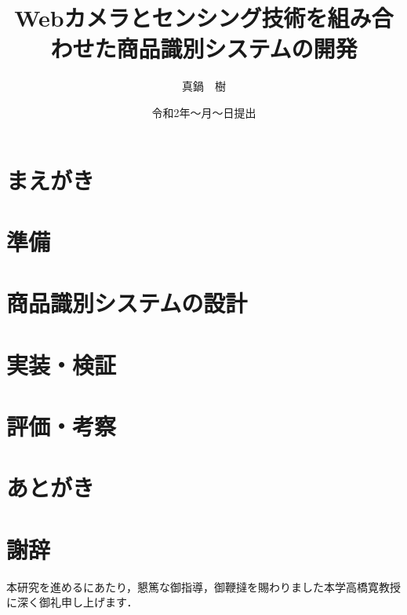 
\newenvironment{indention}[1]{\par
\addtolength{\leftskip}{#1}
\begingroup}{\endgroup\par}

\title{Webカメラとセンシング技術を組み合わせた商品識別システムの開発}
\author{真鍋　樹}
\date{令和2年～月～日提出}


\maketitle
\tableofcontents
\cleardoublepage
{}

\chapter{まえがき}


\chapter{準備}


\chapter{商品識別システムの設計}





\chapter{実装・検証}




\chapter{評価・考察}




\chapter{あとがき}



\newpage
{}
\chapter*{謝辞}
本研究を進めるにあたり，懇篤な御指導，御鞭撻を賜わりました本学高橋寛教授に深く御礼申し上げます．

